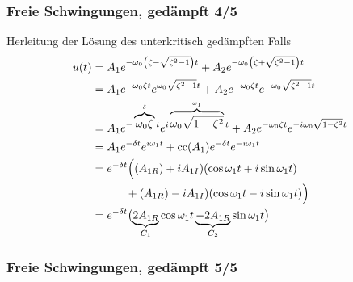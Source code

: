 \begin{frame}
\frametitle{Freie Schwingungen, {\normalsize gedämpft 4/5}}
Herleitung der Lösung des unterkritisch gedämpften Falls
\begin{align*}
 u(t)  &=A_1 e^{-\omega_0\left( \zeta-\sqrt{ \zeta^2-1}\right)t}
  +A_2 e^{-\omega_0\left( \zeta+\sqrt{ \zeta^2-1}\right)t}\\
  &=A_1 e^{-\omega_0 \zeta t}e^{\omega_0 \sqrt{ \zeta^2-1}t}
  +A_2 e^{-\omega_0 \zeta t}e^{-\omega_0 \sqrt{ \zeta^2-1}t}\\
  &=A_1 e^{-\overbrace{\omega_0 \zeta}^{\delta} t}e^{i\overbrace{\omega_0 \sqrt{1-\zeta^2}}^{\omega_1}t}
  +A_2 e^{-\omega_0 \zeta t}e^{-i\omega_0 \sqrt{1-\zeta^2}t}\\
  &=A_1 e^{-\delta t}e^{i\omega_1t}+\mathrm{cc}(A_1) e^{-\delta t}e^{-i\omega_1t}\\
  &= e^{-\delta t}\Bigl( (A_{1R})+i A_{1I}) (\cos\omega_1 t + i \sin \omega_1 t  )\\
  & \qquad \quad +(A_{1R})-i A_{1I}) (\cos\omega_1 t - i \sin \omega_1 t)  \Bigr)\\
  &=e^{-\delta t}\bigl( \underbrace{2A_{1R}}_{C_1}\cos \omega_1 t 
  \underbrace{- 2A_{1R}}_{C_2}\sin \omega_1 t   \bigr)
 \end{align*}
\end{frame}


\begin{frame}
\frametitle{Freie Schwingungen, {\normalsize gedämpft 5/5}}



\end{frame}




